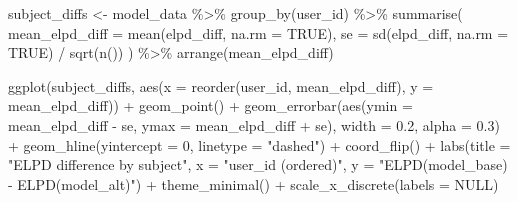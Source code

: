 \documentclass[
  11pt,
  a4paper,
  onecolumn]{article}
\newenvironment{Shaded}{}{}
\newcommand{\AttributeTok}[1]{\textcolor[rgb]{0.84,0.23,0.29}{#1}}
\newcommand{\ConstantTok}[1]{\textcolor[rgb]{0.00,0.36,0.77}{#1}}
\newcommand{\DecValTok}[1]{\textcolor[rgb]{0.00,0.36,0.77}{#1}}
\newcommand{\FloatTok}[1]{\textcolor[rgb]{0.00,0.36,0.77}{#1}}
\newcommand{\FunctionTok}[1]{\textcolor[rgb]{0.44,0.26,0.76}{#1}}
\newcommand{\NormalTok}[1]{\textcolor[rgb]{0.14,0.16,0.18}{#1}}
\newcommand{\OtherTok}[1]{\textcolor[rgb]{0.44,0.26,0.76}{#1}}
\newcommand{\SpecialCharTok}[1]{\textcolor[rgb]{0.00,0.36,0.77}{#1}}
\newcommand{\StringTok}[1]{\textcolor[rgb]{0.01,0.18,0.38}{#1}}
\begin{document}
\begin{Shaded}
\begin{Highlighting}[]
\NormalTok{subject\_diffs }\OtherTok{\textless{}{-}}\NormalTok{ model\_data }\SpecialCharTok{\%\textgreater{}\%}
  \FunctionTok{group\_by}\NormalTok{(user\_id) }\SpecialCharTok{\%\textgreater{}\%}
  \FunctionTok{summarise}\NormalTok{(}
    \AttributeTok{mean\_elpd\_diff =} \FunctionTok{mean}\NormalTok{(elpd\_diff, }\AttributeTok{na.rm =} \ConstantTok{TRUE}\NormalTok{),}
    \AttributeTok{se =} \FunctionTok{sd}\NormalTok{(elpd\_diff, }\AttributeTok{na.rm =} \ConstantTok{TRUE}\NormalTok{) }\SpecialCharTok{/} \FunctionTok{sqrt}\NormalTok{(}\FunctionTok{n}\NormalTok{())}
\NormalTok{  ) }\SpecialCharTok{\%\textgreater{}\%}
  \FunctionTok{arrange}\NormalTok{(mean\_elpd\_diff)}
\end{Highlighting}
\end{Shaded}

\begin{Shaded}
\begin{Highlighting}[]
\FunctionTok{ggplot}\NormalTok{(subject\_diffs, }\FunctionTok{aes}\NormalTok{(}\AttributeTok{x =} \FunctionTok{reorder}\NormalTok{(user\_id, mean\_elpd\_diff), }\AttributeTok{y =}\NormalTok{ mean\_elpd\_diff)) }\SpecialCharTok{+}
  \FunctionTok{geom\_point}\NormalTok{() }\SpecialCharTok{+}
  \FunctionTok{geom\_errorbar}\NormalTok{(}\FunctionTok{aes}\NormalTok{(}\AttributeTok{ymin =}\NormalTok{ mean\_elpd\_diff }\SpecialCharTok{{-}}\NormalTok{ se, }\AttributeTok{ymax =}\NormalTok{ mean\_elpd\_diff }\SpecialCharTok{+}\NormalTok{ se),}
                \AttributeTok{width =} \FloatTok{0.2}\NormalTok{, }\AttributeTok{alpha =} \FloatTok{0.3}\NormalTok{) }\SpecialCharTok{+}
  \FunctionTok{geom\_hline}\NormalTok{(}\AttributeTok{yintercept =} \DecValTok{0}\NormalTok{, }\AttributeTok{linetype =} \StringTok{"dashed"}\NormalTok{) }\SpecialCharTok{+}
  \FunctionTok{coord\_flip}\NormalTok{() }\SpecialCharTok{+}
  \FunctionTok{labs}\NormalTok{(}\AttributeTok{title =} \StringTok{"ELPD difference by subject"}\NormalTok{,}
       \AttributeTok{x =} \StringTok{"user\_id (ordered)"}\NormalTok{,}
       \AttributeTok{y =} \StringTok{"ELPD(model\_base) {-} ELPD(model\_alt)"}\NormalTok{) }\SpecialCharTok{+}
  \FunctionTok{theme\_minimal}\NormalTok{() }\SpecialCharTok{+}
  \FunctionTok{scale\_x\_discrete}\NormalTok{(}\AttributeTok{labels =} \ConstantTok{NULL}\NormalTok{)}
\end{Highlighting}
\end{Shaded}
\end{document}
